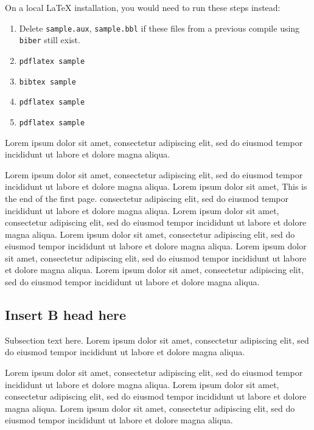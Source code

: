 \documentclass[
  journal=large,
  manuscript=article-type,
  year=2020,
  volume=37,
]{cup-journal}
\begin{document}
On a local \LaTeX{} installation, you would need to run these steps instead:
\begin{enumerate}
    \item Delete \texttt{sample.aux}, \texttt{sample.bbl} if these files from a previous compile using \texttt{biber} still exist.
    \item \verb|pdflatex sample|
    \item \verb|bibtex sample|
    \item \verb|pdflatex sample|
    \item \verb|pdflatex sample|
\end{enumerate}

Lorem ipsum dolor sit amet, consectetur adipiscing elit, sed do eiusmod tempor incididunt ut labore et dolore magna aliqua. 

Lorem ipsum dolor sit amet, consectetur adipiscing elit, sed do eiusmod tempor incididunt ut labore et dolore magna aliqua. Lorem ipsum dolor sit amet, This
\CUPTWOCOL 
is the end of the first page. 
consectetur adipiscing elit, sed do eiusmod tempor incididunt ut labore et dolore magna aliqua. Lorem ipsum dolor sit amet, consectetur adipiscing elit, sed do eiusmod tempor incididunt ut labore et dolore magna aliqua. Lorem ipsum dolor sit amet, consectetur adipiscing elit, sed do eiusmod tempor incididunt ut labore et dolore magna aliqua. Lorem ipsum dolor sit amet, consectetur adipiscing elit, sed do eiusmod tempor incididunt ut labore et dolore magna aliqua. Lorem ipsum dolor sit amet, consectetur adipiscing elit, sed do eiusmod tempor incididunt ut labore et dolore magna aliqua. 

\subsection{Insert B head here}
Subsection text here. Lorem ipsum \citep{Bayer_etal_2013} dolor sit amet, consectetur adipiscing elit, sed do eiusmod tempor incididunt ut labore \citet{Adade_etal_2007} et dolore magna aliqua. 

 Lorem ipsum dolor sit amet, consectetur adipiscing elit, sed do eiusmod tempor incididunt ut labore et dolore magna aliqua. Lorem ipsum dolor sit amet, consectetur adipiscing elit, sed do eiusmod tempor incididunt ut labore et dolore magna aliqua. Lorem ipsum dolor sit amet, consectetur adipiscing elit, sed do eiusmod tempor incididunt ut labore et dolore magna aliqua. 
\end{document}
